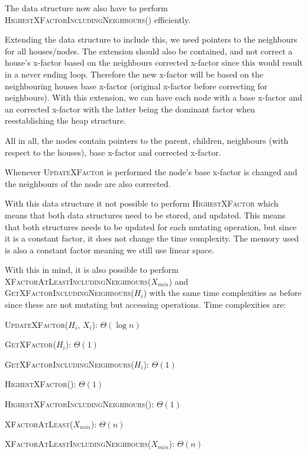 \documentclass[10pt]{article}
\begin{document}
The data structure now also have to perform \textsc{HighestXFactorIncludingNeighbours()} efficiently. 

Extending the data structure to include this, we need pointers to the neighbours for all houses/nodes. The extension should also be contained, and not correct a house's x-factor based on the neighbours corrected x-factor since this would result in a never ending loop. Therefore the new x-factor will be based on the neighbouring houses base x-factor (original x-factor before correcting for neighbours). With this extension, we can have each node with a base x-factor and an corrected x-factor with the latter being the dominant factor when reestablishing the heap structure. 

All in all, the nodes contain pointers to the parent, children, neighbours (with respect to the houses), base x-factor and corrected x-factor.

Whenever \textsc{UpdateXFactor} is performed the node's base x-factor is changed and the neighbours of the node are also corrected.

With this data structure it not possible to perform \textsc{HighestXFactor} which means that both data structures need to be stored, and updated. This means that both structures needs to be updated for each mutating operation, but since it is a constant factor, it does not change the time complexity. The memory used is also a constant factor meaning we still use linear space. 

With this in mind, it is also possible to perform \textsc{XFactorAtLeastIncludingNeighbours($X_{min}$)} and \textsc{GetXFactorIncludingNeighbours($H_i$)} with the same time complexities as before since these are not mutating but accessing operations. Time complexities are: 


\begin{center}
\textsc{UpdateXFactor($H_i$, $X_i$)}: $\Theta(\log n)$

\textsc{GetXFactor($H_i$)}: $\Theta(1)$

\textsc{GetXFactorIncludingNeighbours($H_i$)}: $\Theta(1)$

\textsc{HighestXFactor()}: $\Theta(1)$

\textsc{HighestXFactorIncludingNeighbours()}: $\Theta(1)$

\textsc{XFactorAtLeast($X_{min}$)}: $\Theta(n)$

\textsc{XFactorAtLeastIncludingNeighbours($X_{min}$)}: $\Theta(n)$
\end{center}
\end{document}
